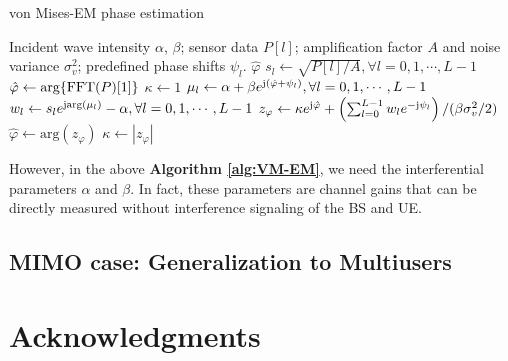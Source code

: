 \documentclass[12pt,draftclsnofoot,journal,onecolumn]{IEEEtran}
\theoremstyle{nonumberplain}
\def \arg {\text{arg}}
\begin{document}
    \begin{algorithm}[H] 
        \caption{von Mises-EM phase estimation} \label{alg:VM-EM}
        \begin{algorithmic}[1]
            \REQUIRE Incident wave intensity $\alpha$, $\beta$; sensor data $P[l]$; amplification factor $A$ and noise variance $\sigma_v^2$; predefined phase shifts $\psi_l$.
            \ENSURE $\hat{\varphi}$
            \STATE $s_l \leftarrow \sqrt{P[l]/A}, \forall l=0,1,\cdots,L-1$
            \STATE $\hat{\varphi} \leftarrow \arg\{{\rm FFT}(P)[1]\}$
            \STATE $\kappa \leftarrow 1$
                \STATE $\mu_l \leftarrow \alpha + \beta e^{{\rm j} (\hat{\varphi}+\psi_l)}, \forall l=0,1,\cdots,L-1$
                \STATE $w_l \leftarrow s_l e^{{\rm j} \arg(\mu_l)} - \alpha, \forall l=0,1,\cdots,L-1$
                \STATE $z_\varphi \leftarrow \kappa e^{{\rm j} \hat{\varphi}} + \left( \sum_{l=0}^{L-1}{w_l e^{-{\rm j} \psi_l}}\right) / (\beta \sigma_v^2/2)$
                \STATE $\hat{\varphi} \leftarrow \arg(z_\varphi)$
                \STATE $\kappa \leftarrow |z_\varphi|$
            \ENDWHILE
        \end{algorithmic}
    \end{algorithm}

    However, in the above {\bf Algorithm \ref{alg:VM-EM}}, we need the interferential parameters $\alpha$ and $\beta$. In fact, these parameters are channel gains that can be directly measured without interference signaling of the BS and UE. 

\subsection{MIMO case: Generalization to Multiusers}

\appendices


\section*{Acknowledgments}
\end{document}
